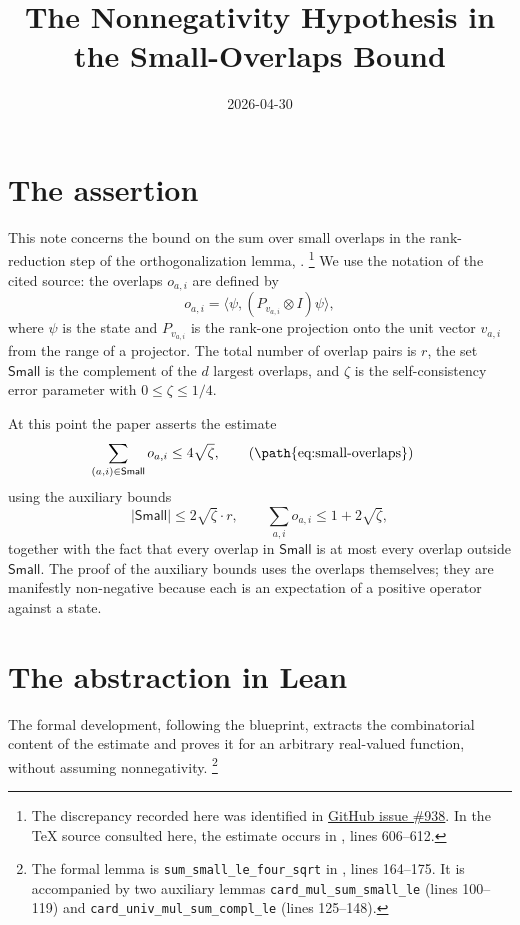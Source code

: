 \documentclass[11pt]{article}
\title{The Nonnegativity Hypothesis in the Small-Overlaps Bound}
\author{}
\date{2026-04-30}
\newcommand{\Small}{\mathsf{Small}}
\begin{document}
\maketitle

\section{The assertion}

This note concerns the bound on the sum over small overlaps in the rank-reduction
step of the orthogonalization lemma,
\cite[Section~\emph{Orthogonalization lemma}]{Ji2020LowIndividualDegree}.
\footnote{The discrepancy recorded here was identified in
\href{https://github.com/LionSR/MIPStarRE/issues/938}{GitHub issue \#938}.
In the TeX source consulted here, the estimate occurs in
, lines 606--612.}
We use the notation of the cited source:
the overlaps $o_{a,i}$ are defined by
\[
  o_{a,i} = \langle \psi, (P_{v_{a,i}} \otimes I)\psi\rangle,
\]
where $\psi$ is the state and $P_{v_{a,i}}$ is the rank-one projection onto the
unit vector $v_{a,i}$ from the range of a projector. The total number of overlap
pairs is $r$, the set $\Small$ is the complement of the $d$ largest overlaps,
and $\zeta$ is the
self-consistency error parameter with $0\le \zeta\le 1/4$.

At this point the paper asserts the estimate
\begin{align}
  \sum_{(a,i)\in\Small} o_{a,i}
    &\le 4\sqrt{\zeta},
      \tag{\path{eq:small-overlaps}}
\end{align}
using the auxiliary bounds
\[
  |\Small| \le 2\sqrt\zeta \cdot r,
  \qquad
  \sum_{a,i} o_{a,i} \le 1+2\sqrt\zeta,
\]
together with the fact that every overlap in $\Small$ is at most every overlap
outside $\Small$. The proof of the auxiliary bounds uses the overlaps
themselves; they are manifestly non-negative because each is an expectation of a
positive operator against a state.

\section{The abstraction in Lean}

The formal development, following the blueprint, extracts the combinatorial
content of the estimate and proves it for an arbitrary real-valued function,
without assuming nonnegativity.
\footnote{The formal lemma is
\texttt{sum\_small\_le\_four\_sqrt} in
,
lines 164--175. It is accompanied by two auxiliary lemmas
\texttt{card\_mul\_sum\_small\_le} (lines 100--119) and
\texttt{card\_univ\_mul\_sum\_compl\_le} (lines 125--148).}
\end{document}

